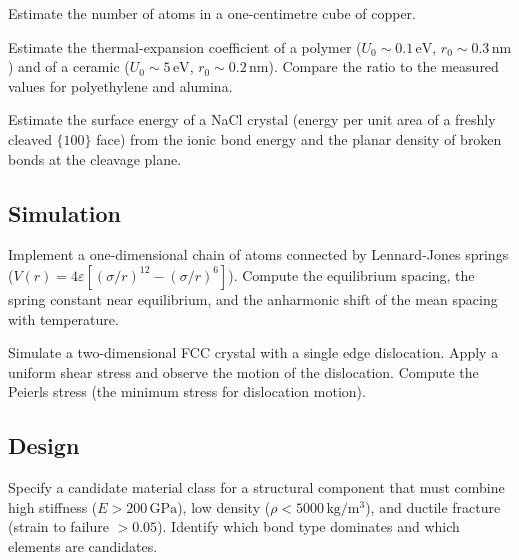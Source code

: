 \begin{exercise}
Estimate the number of atoms in a one-centimetre cube of copper.
\end{exercise}

\begin{exercise}
Estimate the thermal-expansion coefficient of a polymer ($U_0 \sim
0.1\,\text{eV}$, $r_0 \sim 0.3\,\text{nm}$) and of a ceramic ($U_0
\sim 5\,\text{eV}$, $r_0 \sim 0.2\,\text{nm}$). Compare the ratio to
the measured values for polyethylene and alumina.
\end{exercise}

\begin{exercise}
Estimate the surface energy of a NaCl crystal (energy per unit area
of a freshly cleaved $\{100\}$ face) from the ionic bond energy and
the planar density of broken bonds at the cleavage plane.
\end{exercise}

\subsection*{Simulation}

\begin{exercise}
Implement a one-dimensional chain of atoms connected by Lennard-Jones
springs ($V(r) = 4\varepsilon[(\sigma/r)^{12} - (\sigma/r)^6]$).
Compute the equilibrium spacing, the spring constant near
equilibrium, and the anharmonic shift of the mean spacing with
temperature.
\end{exercise}

\begin{exercise}
Simulate a two-dimensional FCC crystal with a single edge dislocation.
Apply a uniform shear stress and observe the motion of the
dislocation. Compute the Peierls stress (the minimum stress for
dislocation motion).
\end{exercise}

\subsection*{Design}

\begin{exercise}
Specify a candidate material class for a structural component that
must combine high stiffness ($E > 200\,\text{GPa}$), low density
($\rho < 5000\,\text{kg}/\text{m}^3$), and ductile fracture (strain
to failure $> 0.05$). Identify which bond type dominates and which
elements are candidates.
\end{exercise}

